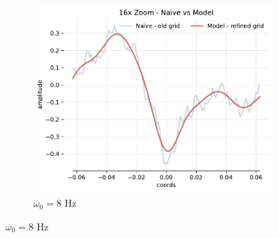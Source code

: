 \begin{figure}[h]
    \begin{subfigure}[b]{0.32\textwidth}
        \centering
        \includegraphics[width=\textwidth]{img/ch3/16x_zoom-1hl-16hf-8hz.pdf}
        \caption{$\omega_0=8$ Hz}
    \end{subfigure}


\end{figure}
